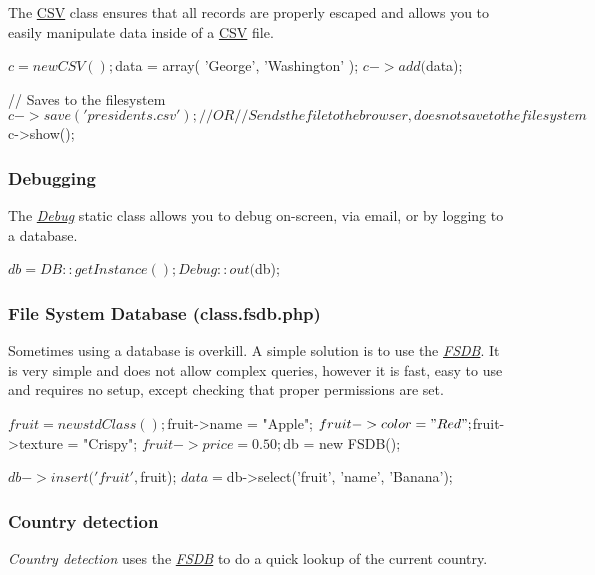 The \hyperlink{class_c_s_v}{C\-S\-V} class ensures that all records are properly escaped and allows you to easily manipulate data inside of a \hyperlink{class_c_s_v}{C\-S\-V} file. \begin{DoxyVerb}$c = new CSV();
$data = array(
    'George',
    'Washington'
);
$c->add($data);

// Saves to the filesystem
$c->save('presidents.csv');

// OR

// Sends the file to the browser, does not save to the filesystem
$c->show();
\end{DoxyVerb}


\subsubsection*{Debugging}

The {\itshape \hyperlink{class_debug}{Debug}} static class allows you to debug on-\/screen, via email, or by logging to a database. \begin{DoxyVerb}$db = DB::getInstance();
Debug::out($db);
\end{DoxyVerb}


\subsubsection*{File System Database (class.\-fsdb.\-php)}

Sometimes using a database is overkill. A simple solution is to use the {\itshape \hyperlink{class_f_s_d_b}{F\-S\-D\-B}}. It is very simple and does not allow complex queries, however it is fast, easy to use and requires no setup, except checking that proper permissions are set. \begin{DoxyVerb}$fruit = new stdClass();

$fruit->name = "Apple";
$fruit->color = "Red";
$fruit->texture = "Crispy";
$fruit->price = 0.50;

$db = new FSDB();

$db->insert('fruit', $fruit);
$data = $db->select('fruit', 'name', 'Banana');
\end{DoxyVerb}


\subsubsection*{Country detection}

{\itshape Country detection} uses the {\itshape \hyperlink{class_f_s_d_b}{F\-S\-D\-B}} to do a quick lookup of the current country. 


